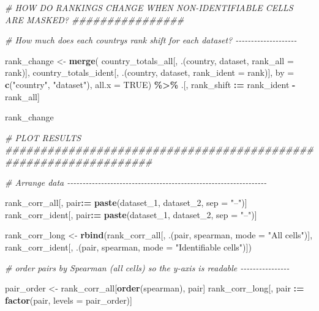\documentclass[
  11pt,
]{article}
\newenvironment{Shaded}{\begin{snugshade}}{\end{snugshade}}
\newcommand{\AttributeTok}[1]{\textcolor[rgb]{0.13,0.29,0.53}{#1}}
\newcommand{\CommentTok}[1]{\textcolor[rgb]{0.56,0.35,0.01}{\textit{#1}}}
\newcommand{\ConstantTok}[1]{\textcolor[rgb]{0.56,0.35,0.01}{#1}}
\newcommand{\FunctionTok}[1]{\textcolor[rgb]{0.13,0.29,0.53}{\textbf{#1}}}
\newcommand{\NormalTok}[1]{#1}
\newcommand{\OtherTok}[1]{\textcolor[rgb]{0.56,0.35,0.01}{#1}}
\newcommand{\SpecialCharTok}[1]{\textcolor[rgb]{0.81,0.36,0.00}{\textbf{#1}}}
\newcommand{\StringTok}[1]{\textcolor[rgb]{0.31,0.60,0.02}{#1}}
\begin{document}
\begin{Shaded}
\begin{Highlighting}[]
\CommentTok{\# HOW DO RANKINGS CHANGE WHEN NON{-}IDENTIFIABLE CELLS ARE MASKED? \#\#\#\#\#\#\#\#\#\#\#\#\#\#\#\#}

\CommentTok{\# How much does each country\textquotesingle{}s rank shift for each dataset? {-}{-}{-}{-}{-}{-}{-}{-}{-}{-}{-}{-}{-}{-}{-}{-}{-}{-}{-}{-}}

\NormalTok{rank\_change }\OtherTok{\textless{}{-}} \FunctionTok{merge}\NormalTok{(}
\NormalTok{  country\_totals\_all[, .(country, dataset, }\AttributeTok{rank\_all =}\NormalTok{ rank)],}
\NormalTok{  country\_totals\_ident[, .(country, dataset, }\AttributeTok{rank\_ident =}\NormalTok{ rank)],}
  \AttributeTok{by =} \FunctionTok{c}\NormalTok{(}\StringTok{"country"}\NormalTok{, }\StringTok{"dataset"}\NormalTok{),}
  \AttributeTok{all.x =} \ConstantTok{TRUE}\NormalTok{) }\SpecialCharTok{\%\textgreater{}\%}
\NormalTok{  .[, rank\_shift }\SpecialCharTok{:=}\NormalTok{ rank\_ident }\SpecialCharTok{{-}}\NormalTok{ rank\_all]}

\NormalTok{rank\_change}

\CommentTok{\# PLOT RESULTS \#\#\#\#\#\#\#\#\#\#\#\#\#\#\#\#\#\#\#\#\#\#\#\#\#\#\#\#\#\#\#\#\#\#\#\#\#\#\#\#\#\#\#\#\#\#\#\#\#\#\#\#\#\#\#\#\#\#\#\#\#\#\#\#\#}

\CommentTok{\# Arrange data {-}{-}{-}{-}{-}{-}{-}{-}{-}{-}{-}{-}{-}{-}{-}{-}{-}{-}{-}{-}{-}{-}{-}{-}{-}{-}{-}{-}{-}{-}{-}{-}{-}{-}{-}{-}{-}{-}{-}{-}{-}{-}{-}{-}{-}{-}{-}{-}{-}{-}{-}{-}{-}{-}{-}{-}{-}{-}{-}{-}{-}{-}{-}{-}{-}}

\NormalTok{rank\_corr\_all[, pair}\SpecialCharTok{:=} \FunctionTok{paste}\NormalTok{(dataset\_1, dataset\_2, }\AttributeTok{sep =} \StringTok{"–"}\NormalTok{)]}
\NormalTok{rank\_corr\_ident[, pair}\SpecialCharTok{:=} \FunctionTok{paste}\NormalTok{(dataset\_1, dataset\_2, }\AttributeTok{sep =} \StringTok{"–"}\NormalTok{)]}

\NormalTok{rank\_corr\_long }\OtherTok{\textless{}{-}} \FunctionTok{rbind}\NormalTok{(rank\_corr\_all[, .(pair, spearman, }\AttributeTok{mode =} \StringTok{"All cells"}\NormalTok{)],}
\NormalTok{                        rank\_corr\_ident[, .(pair, spearman, }\AttributeTok{mode =} \StringTok{"Identifiable cells"}\NormalTok{)])}

\CommentTok{\# order pairs by Spearman (all cells) so the y{-}axis is readable {-}{-}{-}{-}{-}{-}{-}{-}{-}{-}{-}{-}{-}{-}{-}{-}}

\NormalTok{pair\_order }\OtherTok{\textless{}{-}}\NormalTok{ rank\_corr\_all[}\FunctionTok{order}\NormalTok{(spearman), pair]}
\NormalTok{rank\_corr\_long[, pair }\SpecialCharTok{:=} \FunctionTok{factor}\NormalTok{(pair, }\AttributeTok{levels =}\NormalTok{ pair\_order)]}


\end{Highlighting}
\end{Shaded}
\end{document}
